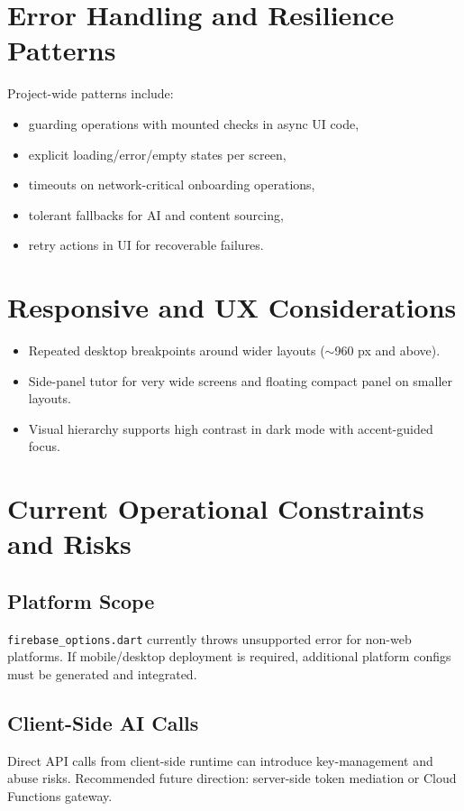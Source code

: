 \documentclass[11pt,a4paper]{article}
\begin{document}
\section{Error Handling and Resilience Patterns}
Project-wide patterns include:
\begin{itemize}
  \item guarding operations with mounted checks in async UI code,
  \item explicit loading/error/empty states per screen,
  \item timeouts on network-critical onboarding operations,
  \item tolerant fallbacks for AI and content sourcing,
  \item retry actions in UI for recoverable failures.
\end{itemize}

\section{Responsive and UX Considerations}
\begin{itemize}
  \item Repeated desktop breakpoints around wider layouts ($\sim$960 px and above).
  \item Side-panel tutor for very wide screens and floating compact panel on smaller layouts.
  \item Visual hierarchy supports high contrast in dark mode with accent-guided focus.
\end{itemize}

\section{Current Operational Constraints and Risks}
\subsection{Platform Scope}
\texttt{firebase\_options.dart} currently throws unsupported error for non-web platforms. If mobile/desktop deployment is required, additional platform configs must be generated and integrated.

\subsection{Client-Side AI Calls}
Direct API calls from client-side runtime can introduce key-management and abuse risks. Recommended future direction: server-side token mediation or Cloud Functions gateway.
\end{document}
